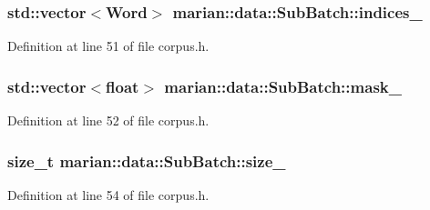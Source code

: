 \subsubsection[{\texorpdfstring{indices\+\_\+}{indices_}}]{\setlength{\rightskip}{0pt plus 5cm}std\+::vector$<${\bf Word}$>$ marian\+::data\+::\+Sub\+Batch\+::indices\+\_\+\hspace{0.3cm}{\ttfamily [private]}}\hypertarget{classmarian_1_1data_1_1SubBatch_ab8aef8d1311a4e44c65f208f91974f60}{}\label{classmarian_1_1data_1_1SubBatch_ab8aef8d1311a4e44c65f208f91974f60}


Definition at line 51 of file corpus.\+h.

\subsubsection[{\texorpdfstring{mask\+\_\+}{mask_}}]{\setlength{\rightskip}{0pt plus 5cm}std\+::vector$<$float$>$ marian\+::data\+::\+Sub\+Batch\+::mask\+\_\+\hspace{0.3cm}{\ttfamily [private]}}\hypertarget{classmarian_1_1data_1_1SubBatch_a49a225fe3d34fd4f8b0213b4bc1ceb74}{}\label{classmarian_1_1data_1_1SubBatch_a49a225fe3d34fd4f8b0213b4bc1ceb74}


Definition at line 52 of file corpus.\+h.

\subsubsection[{\texorpdfstring{size\+\_\+}{size_}}]{\setlength{\rightskip}{0pt plus 5cm}size\+\_\+t marian\+::data\+::\+Sub\+Batch\+::size\+\_\+\hspace{0.3cm}{\ttfamily [private]}}\hypertarget{classmarian_1_1data_1_1SubBatch_ac5110a7be3c18484944dd0691f81aaeb}{}\label{classmarian_1_1data_1_1SubBatch_ac5110a7be3c18484944dd0691f81aaeb}


Definition at line 54 of file corpus.\+h.

